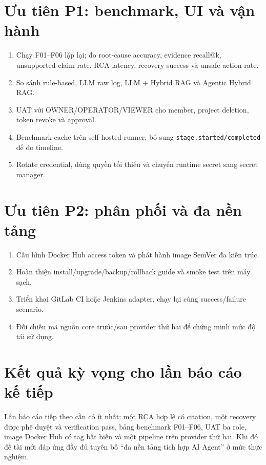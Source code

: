\documentclass[12pt,a4paper,oneside]{report}
\newcommand{\code}[1]{\texttt{#1}}
\begin{document}
\section{Ưu tiên P1: benchmark, UI và vận hành}

\begin{enumerate}
  \item Chạy F01--F06 lặp lại; đo root-cause accuracy, evidence recall@k, unsupported-claim rate,
  RCA latency, recovery success và unsafe action rate.
  \item So sánh rule-based, LLM raw log, LLM + Hybrid RAG và Agentic Hybrid RAG.
  \item UAT với OWNER/OPERATOR/VIEWER cho member, project deletion, token revoke và approval.
  \item Benchmark cache trên self-hosted runner; bổ sung \code{stage.started/completed} để đo timeline.
  \item Rotate credential, dùng quyền tối thiểu và chuyển runtime secret sang secret manager.
\end{enumerate}

\section{Ưu tiên P2: phân phối và đa nền tảng}

\begin{enumerate}
  \item Cấu hình Docker Hub access token và phát hành image SemVer đa kiến trúc.
  \item Hoàn thiện install/upgrade/backup/rollback guide và smoke test trên máy sạch.
  \item Triển khai GitLab CI hoặc Jenkins adapter, chạy lại cùng success/failure scenario.
  \item Đối chiếu mã nguồn core trước/sau provider thứ hai để chứng minh mức độ tái sử dụng.
\end{enumerate}

\section{Kết quả kỳ vọng cho lần báo cáo kế tiếp}

Lần báo cáo tiếp theo cần có ít nhất: một RCA hợp lệ có citation, một recovery được phê duyệt và
verification pass, bảng benchmark F01--F06, UAT ba role, image Docker Hub có tag bất biến và một
pipeline trên provider thứ hai. Khi đó đề tài mới đáp ứng đầy đủ tuyên bố ``đa nền tảng tích hợp
AI Agent'' ở mức thực nghiệm.
\end{document}
